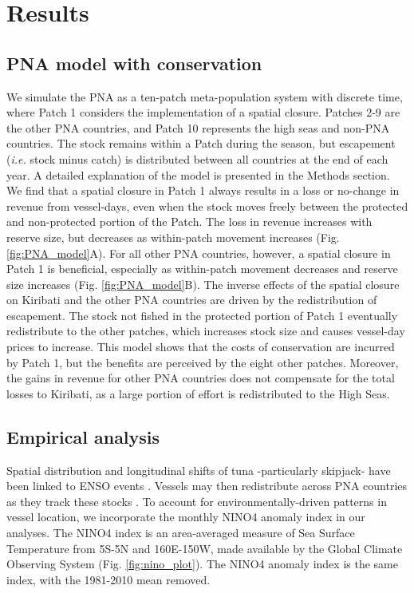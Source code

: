 \documentclass[9p,twocolumn,twoside,lineno]{pnas-new}
\begin{document}
\section{Results}\label{results}

\subsection{PNA model with conservation}

We simulate the PNA as a ten-patch meta-population system with discrete time, where Patch 1 considers the implementation of a spatial closure. Patches 2-9 are the other PNA countries, and Patch 10 represents the high seas and non-PNA countries. The stock remains within a Patch during the season, but escapement (\emph{i.e.} stock minus catch) is distributed between all countries at the end of each year. A detailed explanation of the model is presented in the Methods section. We find that a spatial closure in Patch 1 always results in a loss or no-change in revenue from vessel-days, even when the stock moves freely between the protected and non-protected portion of the Patch. The loss in revenue increases with reserve size, but decreases as within-patch movement increases (Fig. \ref{fig:PNA_model}A). For all other PNA countries, however, a spatial closure in Patch 1 is beneficial, especially as within-patch movement decreases and reserve size increases (Fig. \ref{fig:PNA_model}B). The inverse effects of the spatial closure on Kiribati and the other PNA countries are driven by the redistribution of escapement. The stock not fished in the protected portion of Patch 1 eventually redistribute to the other patches, which increases stock size and causes vessel-day prices to increase. This model shows that the costs of conservation are incurred by Patch 1, but the benefits are perceived by the eight other patches. Moreover, the gains in revenue for other PNA countries does not compensate for the total losses to Kiribati, as a large portion of effort is redistributed to the High Seas.

\subsection{Empirical analysis}

Spatial distribution and longitudinal shifts of tuna -particularly skipjack- have been linked to ENSO events \cite{lehodey_1997}. Vessels may then redistribute across PNA countries as they track these stocks \cite{aqorau_2018}. To account for environmentally-driven patterns in vessel location, we incorporate the monthly NINO4 anomaly index in our analyses. The NINO4 index is an area-averaged measure of Sea Surface Temperature from 5S-5N and 160E-150W, made available by the Global Climate Observing System (Fig. \ref{fig:nino_plot}). The NINO4 anomaly index is the same index, with the 1981-2010 mean removed.
\end{document}
